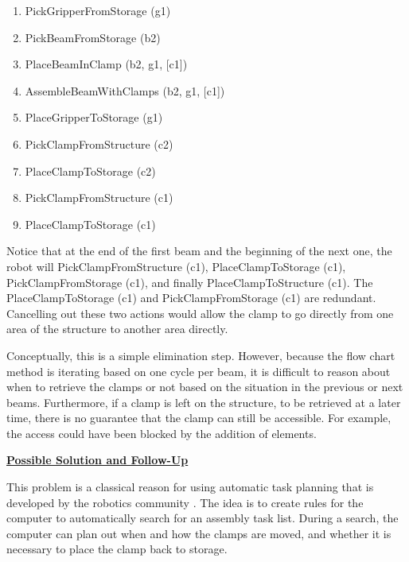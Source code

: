\begin{enumerate}
\begin{enumerate}
	\item {\footnotesize PickGripperFromStorage (g1)}

	\item {\footnotesize PickBeamFromStorage (b2)}

	\item {\footnotesize PlaceBeamInClamp (b2, g1, [c1])}

	\item {\footnotesize AssembleBeamWithClamps (b2, g1, [c1])}

	\item {\footnotesize PlaceGripperToStorage (g1)}

	\item {\footnotesize PickClampFromStructure (c2)}

	\item {\footnotesize PlaceClampToStorage (c2)}

	\item {\footnotesize PickClampFromStructure (c1)}

	\item {\footnotesize PlaceClampToStorage (c1)}

\end{enumerate}
\end{enumerate}
Notice that at the end of the first beam and the beginning of the next one, the robot will PickClampFromStructure (c1), PlaceClampToStorage (c1), PickClampFromStorage (c1), and finally PlaceClampToStructure (c1). The PlaceClampToStorage (c1) and PickClampFromStorage (c1) are redundant. Cancelling out these two actions would allow the clamp to go directly from one area of the structure to another area directly.

Conceptually, this is a simple elimination step. However, because the flow chart method is iterating based on one cycle per beam, it is difficult to reason about when to retrieve the clamps or not based on the situation in the previous or next beams. Furthermore, if a clamp is left on the structure, to be retrieved at a later time, there is no guarantee that the clamp can still be accessible. For example, the access could have been blocked by the addition of elements. 

\textbf{\ul{Possible Solution and Follow-Up}}

This problem is a classical reason for using automatic task planning that is developed by the robotics community \parencite{ghallabAutomatedPlanningActing2016}. The idea is to create rules for the computer to automatically search for an assembly task list. During a search, the computer can plan out when and how the clamps are moved, and whether it is necessary to place the clamp back to storage. 

